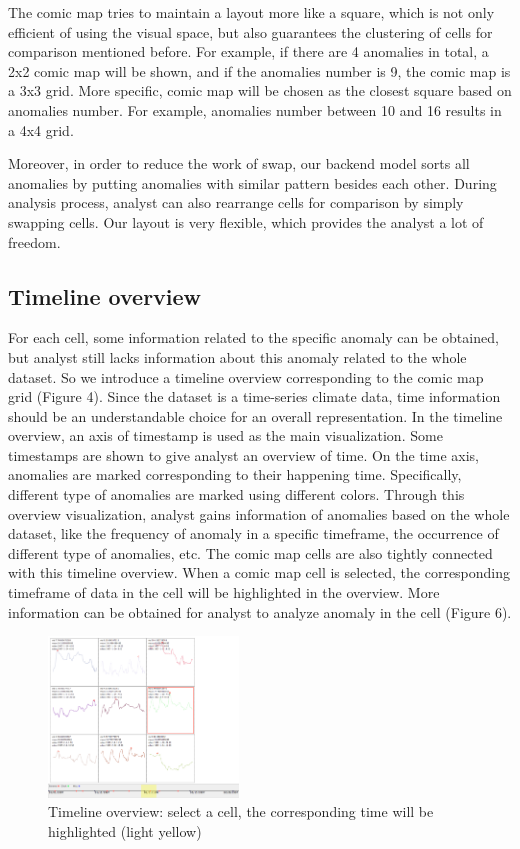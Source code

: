 \documentclass{vgtc}                          %
\begin{document}
The comic map tries to maintain a layout more like a square, which is not only efficient of using the visual space, but also guarantees the clustering of cells for comparison mentioned before. For example, if there are 4 anomalies in total, a 2x2 comic map will be shown, and if the anomalies number is 9, the comic map is a 3x3 grid. More specific, comic map will be chosen as the closest square based on anomalies number. For example, anomalies number between 10 and 16 results in a 4x4 grid.

Moreover, in order to reduce the work of swap, our backend model sorts all anomalies by putting anomalies with similar pattern besides each other. During analysis process, analyst can also rearrange cells for comparison by simply swapping cells. Our layout is very flexible, which provides the analyst a lot of freedom.

\subsection{Timeline overview}

For each cell, some information related to the specific anomaly can be obtained, but analyst still lacks information about this anomaly related to the whole dataset. So we introduce a timeline overview corresponding to the comic map grid (Figure 4). 
Since the dataset is a time-series climate data, time information should be an understandable choice for an overall representation. In the timeline overview, an axis of timestamp is used as the main visualization. Some timestamps are shown to give analyst an overview of time. On the time axis, anomalies are marked corresponding to their happening time. Specifically, different type of anomalies are marked using different colors. Through this overview visualization, analyst gains information of anomalies based on the whole dataset, like the frequency of anomaly in a specific timeframe, the occurrence of different type of anomalies, etc. 
The comic map cells are also tightly connected with this timeline overview. When a comic map cell is selected, the corresponding timeframe of data in the cell will be highlighted in the overview. More information can be obtained for analyst to analyze anomaly in the cell (Figure 6). 

\begin{figure}[htb]
	\centering
	\includegraphics[width=0.45\textwidth]{timeline2.png}
	\caption{Timeline overview: select a cell, the corresponding time will be highlighted (light yellow)}
\end{figure}
\end{document}
